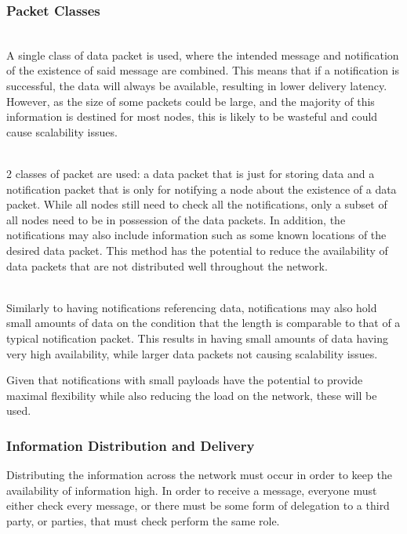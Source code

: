 		\subsubsection{Packet Classes}
			\begin{description}[topsep=-5pt,itemsep=-1ex,partopsep=2ex,parsep=1.5ex]
				\item[Data as Notifications] \hfill \\
				A single class of data packet is used, where the intended message and notification of the existence of said message are combined. This means that if a notification is successful, the data will always be available, resulting in lower delivery latency. However, as the size of some packets could be large, and the majority of this information is destined for most nodes, this is likely to be wasteful and could cause scalability issues.
				\item[Notifications Referencing Data] \hfill \\
				2 classes of packet are used: a data packet that is just for storing data and a notification packet that is only for notifying a node about the existence of a data packet. While all nodes still need to check all the notifications, only a subset of all nodes need to be in possession of the data packets. In addition, the notifications may also include information such as some known locations of the desired data packet. This method has the potential to reduce the availability of data packets that are not distributed well throughout the network.
				\item[Notifications With Small Payload] \hfill \\
				Similarly to having notifications referencing data, notifications may also hold small amounts of data on the condition that the length is comparable to that of a typical notification packet. This results in having small amounts of data having very high availability, while larger data packets not causing scalability issues.
			\end{description}
			
			
			Given that notifications with small payloads have the potential to provide maximal flexibility while also reducing the load on the network, these will be used.
			
		\subsubsection{Information Distribution and Delivery}
			Distributing the information across the network must occur in order to keep the availability of information high. In order to receive a message, everyone must either check every message, or there must be some form of delegation to a third party, or parties, that must check perform the same role.
			
